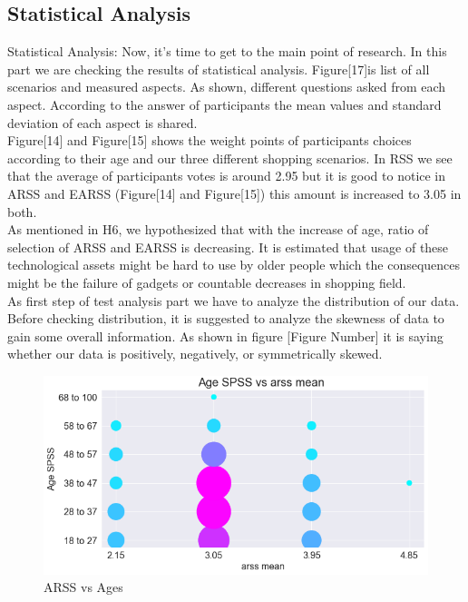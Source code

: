 \documentclass[letterpaper, 10 pt, conference]{ieeeconf}
\begin{document}
\subsection{Statistical Analysis}
Statistical Analysis: Now, it’s time to get to the main point of research. In this part we are checking the results of statistical analysis. Figure[17]is list of all scenarios and measured aspects. As shown, different questions asked from each aspect. According to the answer of participants the mean values and standard deviation of each aspect is shared.\\
Figure[14] and Figure[15] shows the weight points of participants choices according to their age and our three different shopping scenarios. In RSS we see that the average of participants votes is around 2.95 but it is good to notice in ARSS and EARSS (Figure[14] and Figure[15]) this amount is increased to 3.05 in both.\\
As mentioned in H6, we hypothesized that with the increase of age, ratio of selection of ARSS and EARSS is decreasing. It is estimated that usage of these technological assets might be hard to use by older people which the consequences might be the failure of gadgets or countable decreases in shopping field.  \\ As first step of test analysis part we have to analyze the distribution of our data. Before checking distribution, it is suggested to analyze the skewness of data to gain some overall information. As shown in figure [Figure Number] it is saying whether our data is positively, negatively, or symmetrically skewed. 

\begin{figure}[!ht]
    \centering
    \includegraphics[scale = 0.5]{Picture14.png}
    \caption{ARSS vs Ages}
\end{figure}
\end{document}
